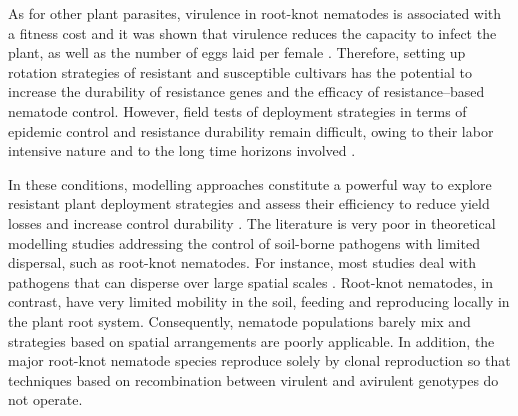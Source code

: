 {{{{As for other plant parasites, virulence in root-knot
  nematodes is associated with a fitness cost and it was shown that
virulence reduces the capacity to infect the plant, as well as the
number of eggs laid per female
\citep{Castagnone-Sereno2007,Djian-Caporalino2011}.  Therefore,
setting up rotation strategies of resistant and susceptible cultivars
has the potential to increase the durability of resistance genes and
the efficacy of resistance–based nematode control.  However, field
tests of deployment strategies in terms of epidemic control and
resistance durability remain difficult, owing to their labor intensive
nature and to the long time horizons involved
\citep{Djian-Caporalino2014}.

In these conditions, modelling approaches constitute a powerful way to
explore resistant plant deployment strategies and assess their
efficiency to reduce yield losses and increase control durability
\citep{Brown2015,Papaix2018}. {The} literature is very poor in
theoretical modelling studies addressing the control of soil-borne
pathogens with limited dispersal, such as {root-knot nematodes}. For
instance, most studies deal with pathogens that can disperse over
large spatial scales
\citep{Gilligan1995,Thrall1997,Otten2006,Fabre2012,Djidjou-Demasse2017,Lof2017}. {Root-knot
  nematodes}, in contrast, have very limited mobility in the soil,
feeding and reproducing locally in the plant root
system. Consequently, nematode populations barely mix and strategies
based on spatial arrangements are poorly applicable. In addition, the
major {root-knot nematode} species reproduce solely by clonal
reproduction so that techniques based on recombination between
virulent and avirulent genotypes do not operate.

}}}}
